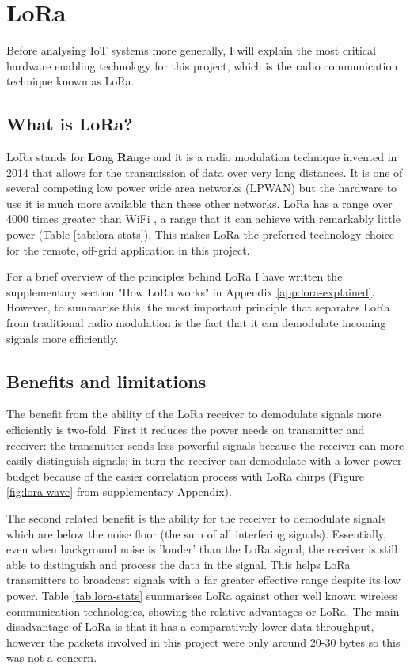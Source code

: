\section{LoRa}\label{sec:lora}

Before analysing IoT systems more generally, I will explain the most critical
hardware enabling technology for this project, which is the radio communication
technique known as LoRa.

\subsection{What is LoRa?}

LoRa stands for \textbf{Lo}ng \textbf{Ra}nge and it is a radio modulation
technique invented in 2014 that allows for the transmission of data over very
long distances. It is one of several competing low power wide area networks
(LPWAN) but the hardware to use it is much more available than these other
networks. LoRa has a range over 4000 times greater than WiFi \cite{spiess2019},
a range that it can achieve with remarkably little power (Table
\ref{tab:lora-stats}). This makes LoRa the preferred technology choice for the
remote, off-grid application in this project.

For a brief overview of the principles behind LoRa I have written the
supplementary section "How LoRa works" in Appendix \ref{app:lora-explained}.
However, to summarise this, the most important principle that separates LoRa
from traditional radio modulation is the fact that it can demodulate incoming
signals more efficiently.

\subsection{Benefits and limitations}\label{sec:lora-benefits}

The benefit from the ability of the LoRa receiver to demodulate signals more
efficiently is two-fold. First it reduces the power needs on transmitter and
receiver: the transmitter sends less powerful signals because the receiver can
more easily distinguish signals; in turn the receiver can demodulate with a
lower power budget because of the easier correlation process with LoRa chirps
(Figure \ref{fig:lora-wave} from supplementary Appendix).

The second related benefit is the ability for the receiver to demodulate signals
which are below the noise floor (the sum of all interfering signals).
Essentially, even when background noise is 'louder' than the LoRa signal, the
receiver is still able to distinguish and process the data in the signal. This
helps LoRa transmitters to broadcast signals with a far greater effective range
despite its low power. Table \ref{tab:lora-stats} summarises LoRa against other
well known wireless communication technologies, showing the relative advantages
or LoRa. The main disadvantage of LoRa is that it has a comparatively lower data
throughput, however the packets involved in this project were only around 20-30
bytes so this was not a concern.

